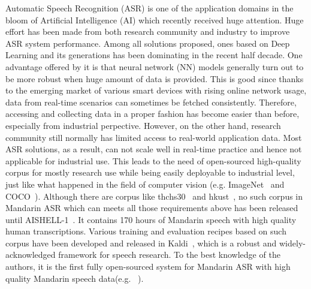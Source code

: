 \documentclass[a4paper]{article}
\begin{document}
Automatic Speech Recognition (ASR) is one of the application domains in the bloom of Artificial
Intelligence (AI) which recently received huge attention. Huge effort has been made from both research community and industry
to improve ASR system performance. Among all solutions proposed, ones based on Deep Learning and its generations has been dominating
in the recent half decade. One advantage offered by it is that neural network (NN) models generally turn out to be more robust when
huge amount of data is provided. This is good since thanks to the emerging market of various smart devices with rising online network usage, data from
real-time scenarios can sometimes be fetched consistently. Therefore, accessing and 
collecting data in a proper fashion has become easier than before, especially from industrial perpective.
However, on the other hand, research community still normally has limited access to real-world
application data. Most ASR solutions, as a result, can not scale well in real-time practice and hence not applicable for industrial use. This leads to the need of open-sourced high-quality corpus for mostly research use while being easily deployable to industrial level, just like what happened in the field of computer vision (e.g. ImageNet~\cite{imagenet} and COCO~\cite{coco}). Although there are corpus like thchs30~\cite{thchs30} and hkust~\cite{hkust1}, no such corpus in Mandarin ASR which can meets all those requirements above has been released until AISHELL-1~\cite{aishell1}.
It contains 170 hours of Mandarin speech with high quality human transcriptions. 
Various training and evaluation recipes based on such corpus have been developed and released in Kaldi~\cite{kaldi}, 
which is a robust and widely-acknowledged framework for speech research. 
To the best knowledge of the authors, it is the first fully open-sourced system for Mandarin ASR with 
high quality Mandarin speech data(e.g. ~\cite{do2017, do2018_1, do2018_2}).

\end{document}

